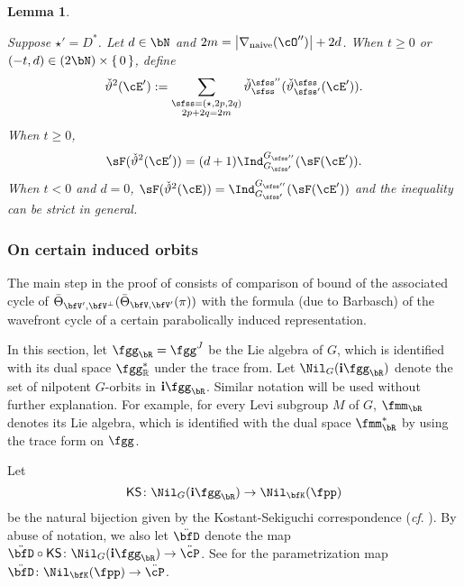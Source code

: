 \documentclass[12pt,a4paper]{amsart}
\def\abs#1{\left|{#1}\right|}
\newcommand{\R}{\mathbb R}
\def\DD{\nabla}
\numberwithin{equation}{section}
\newtheorem{lem}[thm]{Lemma}
\theoremstyle{remark}
\def\abfV{\bfV'}
\def\KS{\mathsf{KS}}
\def\Thetab{\bar{\Theta}}
\def\ssP{{\ddot\cP}}
\def\ssD{\ddot{\bfD}}
\def\DDn{\DD_{\mathrm{naive}}}
\def\cOpp{\cO^{\prime\prime}}
\begin{document}
\begin{lem}
\begin{enuma}
 \item Suppose $\star' = D^*$. 
    Let $d\in \bN$ and $2m = \abs{\DDn(\cOpp)}+2d$.
    When $t\geq 0$ or $(-t,d) \in (2\bN)\times \set{0}$, define
 \[
   \dblift(\cE') := 
   \sum_{\substack{\sfss = (\star,2p,2q)\\ 2p+2q=2m}}
   \dlift_{\sfss}^{\sfss''}(\dlift_{\sfss'}^{\sfss}(\cE')).
   \]    
  When $t\geq 0$,   
  \[
    \sF(\dblift(\cE')) = (d+1) \indsss(\sF(\cE')). 
  \]
  When $t< 0$ and $d=0$,  $\sF(\dblift(\cE)) = \indsss(\sF(\cE'))$ 
  and the inequality can be strict in general. 
  \end{enuma}
\end{lem}


\subsubsection{On certain induced orbits}\label{subsec:induced}


The main step in the proof of  consists of comparison of bound of the associated cycle of
$\Thetab_{\abfV,\bfV^\perp}(\Thetab_{\bfV,\abfV}(\pi))$ with the formula (due to Barbasch) of the wavefront cycle of
a certain parabolically induced representation.

 In this section, let $\fgg_\bR
=\fgg^J$ be the Lie algebra of $G$, which is identified with its dual space $\fgg^*_\R$ under the trace from. Let $\Nil_{G}(\mathbf i \fgg_\bR)$
denote the set of nilpotent $G$-orbits in $\mathbf i\fgg_\bR$. Similar notation will be used without further explanation. For example, for every Levi subgroup $M$  of $G$, $\fmm_\bR$ denotes its Lie algebra, which is  identified with the dual space $\fmm^*_\bR$ by using the trace form on $\fgg$.

 Let
\[
\KS\colon \Nil_{G}(\mathbf i\fgg_\bR) \rightarrow \Nil_{\bfK}(\fpp)
\]
 be the natural
bijection given by the Kostant-Sekiguchi correspondence
(\emph{cf}. \cite[Equation~(6.7)]{SV}).
By abuse of notation, we also let $\ssD$ denote the map $\ssD\circ
\KS\colon  \Nil_{G}(\mathbf i\fgg_\bR) \rightarrow \ssP$. See  for the parametrization map $\ssD \colon
\Nil_{\bfK}(\fpp) \rightarrow \ssP$.
\end{document}
